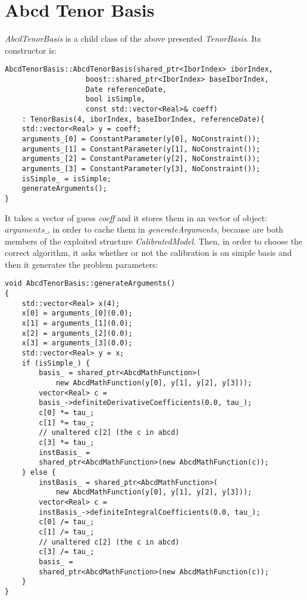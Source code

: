 \section{Abcd Tenor Basis}

\textit{AbcdTenorBasis} is a child class of the above presented \textit{TenorBasis}. Its constructor is: 

\begin{lstlisting}
AbcdTenorBasis::AbcdTenorBasis(shared_ptr<IborIndex> iborIndex,
                   boost::shared_ptr<IborIndex> baseIborIndex,
                   Date referenceDate,
                   bool isSimple,
                   const std::vector<Real>& coeff)
    : TenorBasis(4, iborIndex, baseIborIndex, referenceDate){
    std::vector<Real> y = coeff;
    arguments_[0] = ConstantParameter(y[0], NoConstraint());
    arguments_[1] = ConstantParameter(y[1], NoConstraint());
    arguments_[2] = ConstantParameter(y[2], NoConstraint());
    arguments_[3] = ConstantParameter(y[3], NoConstraint());
    isSimple_ = isSimple;
    generateArguments();
}
\end{lstlisting}

It takes a vector of guess \textit{coeff} and it stores them in an vector of object: $arguments\_$, in order to cache them in \textit{generateArguments}, because are both members of the exploited structure \textit{CalibratedModel}. Then, in order to choose the correct algorithm, it asks whether or not the calibration is on simple basis and then it generates the problem parameters:

\begin{lstlisting}
void AbcdTenorBasis::generateArguments() 
{
    std::vector<Real> x(4);
    x[0] = arguments_[0](0.0);
    x[1] = arguments_[1](0.0);
    x[2] = arguments_[2](0.0);
    x[3] = arguments_[3](0.0);
    std::vector<Real> y = x;
    if (isSimple_) {
        basis_ = shared_ptr<AbcdMathFunction>(
            new AbcdMathFunction(y[0], y[1], y[2], y[3]));
        vector<Real> c =
        basis_->definiteDerivativeCoefficients(0.0, tau_);
        c[0] *= tau_;
        c[1] *= tau_;
        // unaltered c[2] (the c in abcd)
        c[3] *= tau_;
        instBasis_ =
        shared_ptr<AbcdMathFunction>(new AbcdMathFunction(c));
    } else {
        instBasis_ = shared_ptr<AbcdMathFunction>(
            new AbcdMathFunction(y[0], y[1], y[2], y[3]));
        vector<Real> c = 
        instBasis_->definiteIntegralCoefficients(0.0, tau_);
        c[0] /= tau_;
        c[1] /= tau_;
        // unaltered c[2] (the c in abcd)
        c[3] /= tau_;
        basis_ =
        shared_ptr<AbcdMathFunction>(new AbcdMathFunction(c));
    }
}
\end{lstlisting}


